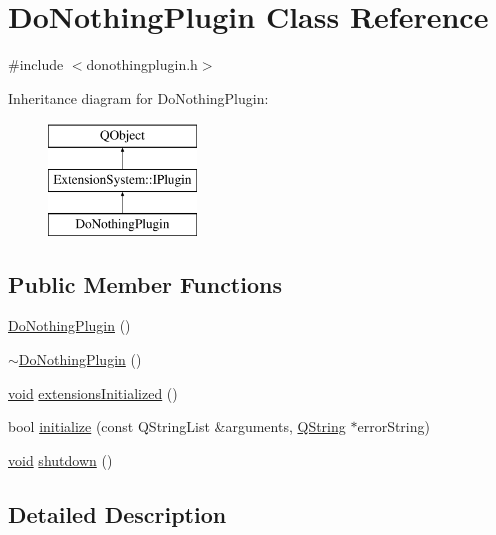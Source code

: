 \hypertarget{class_do_nothing_plugin}{\section{Do\-Nothing\-Plugin Class Reference}
\label{class_do_nothing_plugin}
}


{\ttfamily \#include $<$donothingplugin.\-h$>$}

Inheritance diagram for Do\-Nothing\-Plugin\-:\begin{figure}[H]
\begin{center}
\leavevmode
\includegraphics[height=3.000000cm]{class_do_nothing_plugin}
\end{center}
\end{figure}
\subsection*{Public Member Functions}
\begin{DoxyCompactItemize}
\item 
\hyperlink{group___do_nothing_plugin_ga5a69c051df33ad86daa499ac440b9097}{Do\-Nothing\-Plugin} ()
\item 
\hyperlink{group___do_nothing_plugin_gad61344cbd9fb9103b6e3b8f6da089030}{$\sim$\-Do\-Nothing\-Plugin} ()
\item 
\hyperlink{group___u_a_v_objects_plugin_ga444cf2ff3f0ecbe028adce838d373f5c}{void} \hyperlink{group___do_nothing_plugin_ga82d133252a7e9bba0308a0a2674541f3}{extensions\-Initialized} ()
\item 
bool \hyperlink{group___do_nothing_plugin_ga5038a5ac3f0abbd6c99a369d6d2ee9f4}{initialize} (const Q\-String\-List \&arguments, \hyperlink{group___u_a_v_objects_plugin_gab9d252f49c333c94a72f97ce3105a32d}{Q\-String} $\ast$error\-String)
\item 
\hyperlink{group___u_a_v_objects_plugin_ga444cf2ff3f0ecbe028adce838d373f5c}{void} \hyperlink{group___do_nothing_plugin_gaa91993d8fa19262963650daf59993688}{shutdown} ()
\end{DoxyCompactItemize}


\subsection{Detailed Description}


